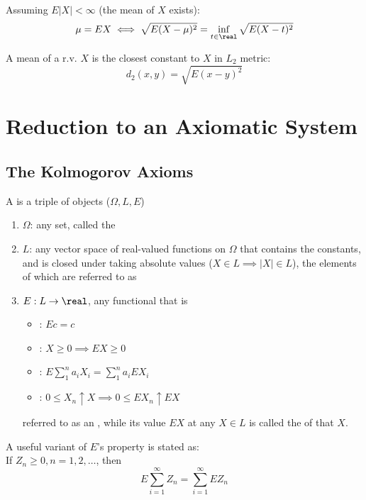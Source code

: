 \documentclass[11pt]{article}
\numberwithin{equation}{section}
\begin{document}
\proposition Assuming $E|X| < \infty$ (the mean of $X$ exists):
\begin{equation}
	\mu = EX \iff \sqrt{E(X-\mu)^2} = \inf_{t \in \real} \sqrt{E(X-t)^2}
\end{equation}

\remark
A mean of a r.v. $X$ is the closest constant to $X$ in $L_2$ metric:
$$d_2(x,y) = \sqrt{E(x-y)^2}$$

\section{Reduction to an Axiomatic System}
\subsection{The Kolmogorov Axioms}
A  is a triple of objects ($\Omega, L, E$)
\begin{enumerate}
	\item $\Omega$: any set, called the 
	\item $L$: any vector space of real-valued functions on $\Omega$ that contains the constants, and is closed under taking absolute values ($X \in L \implies |X| \in L$), the elements of which are referred to as 
	\item $E: L \rightarrow \real$, any functional that is 
	\begin{itemize}
		\item {}: $Ec = c$
		\item {}: $X \geq 0 \implies EX \geq 0$
		\item {}: $E\sum_1^na_iX_i = \sum_1^na_iEX_i$
		\item {}: $0\leq X_n \uparrow X \implies 0 \leq EX_n \uparrow EX$
	\end{itemize}
	referred to as an , while its value $EX$ at any $X \in L$ is called the  of that $X$.
\end{enumerate} 

\property[continuity]
A useful variant of $E$'s  property is stated as:\\
If $Z_n \geq 0, n = 1, 2, \hdots$, then 
\begin{equation}
	E\sum_{i=1}^\infty Z_n = \sum_{i=1}^\infty EZ_n
\end{equation}
\end{document}
